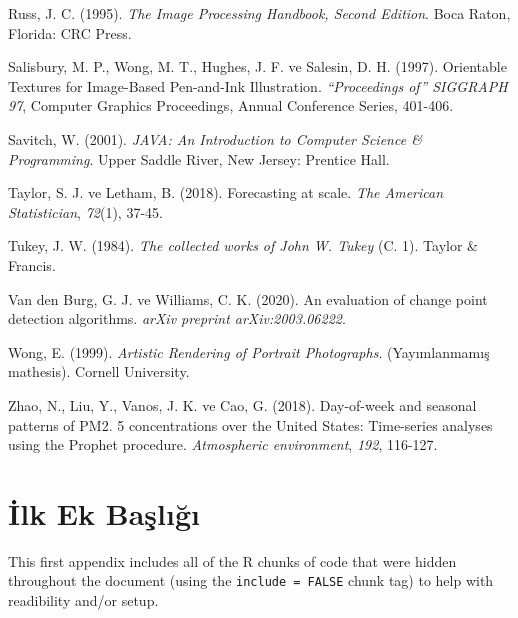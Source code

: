 \documentclass[12pt,twoside]{deuthesis}
\begin{document}
\begin{CSLReferences}{1}{0}
\leavevmode{}%
Russ, J. C. (1995). \emph{{The Image Processing Handbook, Second Edition}}. Boca Raton, Florida: CRC Press.

\leavevmode{}%
Salisbury, M. P., Wong, M. T., Hughes, J. F. ve Salesin, D. H. (1997). Orientable Textures for Image-Based Pen-and-Ink Illustration. \emph{{``Proceedings of''} SIGGRAPH 97}, Computer Graphics Proceedings, Annual Conference Series, 401-406.

\leavevmode{}%
Savitch, W. (2001). \emph{JAVA: An Introduction to Computer Science \& Programming}. Upper Saddle River, New Jersey: Prentice Hall.

\leavevmode{}%
Taylor, S. J. ve Letham, B. (2018). Forecasting at scale. \emph{The American Statistician}, \emph{72}(1), 37-45.

\leavevmode{}%
Tukey, J. W. (1984). \emph{The collected works of John W. Tukey} (C. 1). Taylor \& Francis.

\leavevmode{}%
Van den Burg, G. J. ve Williams, C. K. (2020). An evaluation of change point detection algorithms. \emph{arXiv preprint arXiv:2003.06222}.

\leavevmode{}%
Wong, E. (1999). \emph{{Artistic Rendering of Portrait Photographs}}. (Yayımlanmamış mathesis). Cornell University.

\leavevmode{}%
Zhao, N., Liu, Y., Vanos, J. K. ve Cao, G. (2018). Day-of-week and seasonal patterns of PM2. 5 concentrations over the United States: Time-series analyses using the Prophet procedure. \emph{Atmospheric environment}, \emph{192}, 116-127.

\end{CSLReferences}

\setlength{\parindent}{-0.20in}
\setlength{\leftskip}{0.20in}
\setlength{\parskip}{8pt}

\appendix

\hypertarget{ilk-ek-baux15flux131ux11fux131}{%
\chapter{İlk Ek Başlığı}\label{ilk-ek-baux15flux131ux11fux131}}

This first appendix includes all of the R chunks of code that were hidden throughout the document (using the \texttt{include\ =\ FALSE} chunk tag) to help with readibility and/or setup.
\end{document}
